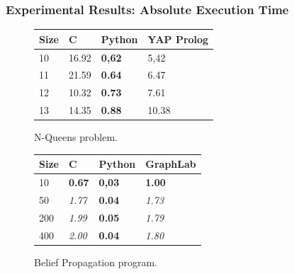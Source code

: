 \documentclass{beamer}
\begin{document}
\begin{frame}[fragile]
   \frametitle{Experimental Results: Absolute Execution Time}
   \begin{figure}[b]
      \begin{tabular}{ | l | l | l | l |}
       \hline

       Size & C & Python & YAP Prolog \\ \hline\hline
       10 & 16.92 & \textbf{0,62} & 5,42 \\
       11 & 21.59 & \textbf{0.64} & 6.47 \\
       12 & 10.32 & \textbf{0.73} & 7.61 \\
       13 & 14.35 & \textbf{0.88} & 10.38 \\
       \hline
       \end{tabular}
       \caption{N-Queens problem.}
    \end{figure}
    \begin{figure}[b]
       \begin{tabular}{ | l | l | l | l |}
        \hline

        Size & C & Python & GraphLab \\ \hline\hline
        10 & \textbf{0.67} & \textbf{0,03} & \textbf{1.00} \\
        50 & \textit{1.77} & \textbf{0.04} & \textit{1.73} \\
        200 & \textit{1.99} & \textbf{0.05} & \textit{1.79} \\
        400 & \textit{2.00} & \textbf{0.04} & \textit{1.80} \\
        \hline
        \end{tabular}
        \caption{Belief Propagation program.}
    \end{figure}
\end{frame}
\end{document}
